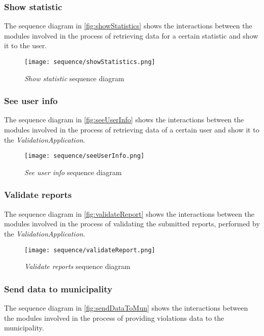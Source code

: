 \clearpage
\subsubsection{Show statistic}
The sequence diagram in \autoref{fig:showStatistics} shows the interactions between the modules involved in the process of retrieving data
for a certain statistic and show it to the user.\\

\begin{figure}[h!]
	\centering
	\texttt{[image: sequence/showStatistics.png]}
	\caption{
		\label{fig:showStatistics} 
		\emph{Show statistic} sequence diagram
	}
\end{figure}

\clearpage
\subsubsection{See user info}
The sequence diagram in \autoref{fig:seeUserInfo} shows the interactions between the modules involved in the process of retrieving data of a certain user and show it to the \emph{ValidationApplication}.\\

\begin{figure}[h!]
	\centering
	\texttt{[image: sequence/seeUserInfo.png]}
	\caption{
		\label{fig:seeUserInfo} 
		\emph{See user info} sequence diagram
	}
\end{figure}
\clearpage

\subsubsection{Validate reports}
The sequence diagram in \autoref{fig:validateReport} shows the interactions between the modules involved in the process of validating the submitted reports, performed by the \emph{ValidationApplication}.\\

\begin{figure}[h!]
	\centering
	\texttt{[image: sequence/validateReport.png]}
	\caption{
		\label{fig:validateReport} 
		\emph{Validate reports} sequence diagram
	}
\end{figure}
\clearpage

\subsubsection{Send data to municipality}
The sequence diagram in \autoref{fig:sendDataToMun} shows the interactions between the modules involved in the process of providing violations data to the municipality.\\

